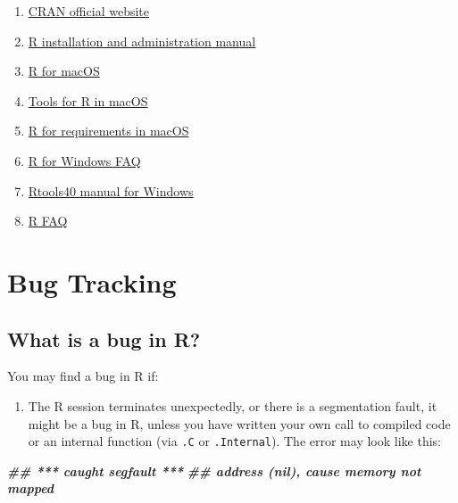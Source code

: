 \documentclass[
]{book}
\newenvironment{Shaded}{\begin{snugshade}}{\end{snugshade}}
\newcommand{\DocumentationTok}[1]{\textcolor[rgb]{0.56,0.35,0.01}{\textbf{\textit{#1}}}}
\providecommand{\tightlist}{%
  \setlength{\itemsep}{0pt}\setlength{\parskip}{0pt}}
\begin{document}
\begin{enumerate}
\def\labelenumi{\arabic{enumi}.}
\item
  \href{https://cran.r-project.org}{CRAN official website}
\item
  \href{https://cran.r-project.org/doc/manuals/r-patched/R-admin.html}{R installation and administration manual}
\item
  \href{https://mac.r-project.org/}{R for macOS}
\item
  \href{https://mac.r-project.org/tools/}{Tools for R in macOS}
\item
  \href{https://mac.r-project.org/src/}{R for requirements in macOS}
\item
  \href{https://cran.r-project.org/bin/windows/base/rw-FAQ.html}{R for Windows FAQ}
\item
  \href{https://cran.r-project.org/bin/windows/Rtools/}{Rtools40 manual for Windows}
\item
  \href{https://cran.r-project.org/doc/FAQ/R-FAQ.html}{R FAQ}
\end{enumerate}

\hypertarget{BugTrack}{%
\chapter{Bug Tracking}\label{BugTrack}}

\hypertarget{what-is-a-bug-in-r}{%
\section{What is a bug in R?}\label{what-is-a-bug-in-r}}

You may find a bug in R if:

\begin{enumerate}
\def\labelenumi{\arabic{enumi}.}
\tightlist
\item
  The R session terminates unexpectedly, or there is a segmentation fault, it might be a bug in R, unless you have written your own call to compiled code or an internal function (via \texttt{.C} or \texttt{.Internal}). The error may look like this:
\end{enumerate}

\begin{Shaded}
\begin{Highlighting}[]
\DocumentationTok{\#\#  *** caught segfault ***}
\DocumentationTok{\#\# address (nil), cause \textquotesingle{}memory not mapped\textquotesingle{}}
\end{Highlighting}
\end{Shaded}
\end{document}
